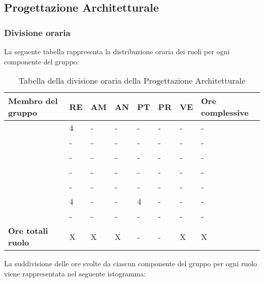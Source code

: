 \subsection{Progettazione Architetturale}

\subsubsection{Divisione oraria}
La seguente tabella rappresenta la distribuzione oraria dei ruoli per ogni componente del gruppo:
\renewcommand{\arraystretch}{2}
\begin{longtable}[h!] { C{4cm} C{1cm} C{1cm} C{1cm} C{1cm} C{1cm} C{1cm} C{3cm}}
\caption{Tabella della divisione oraria della Progettazione Architetturale}\\
\rowcolor{\primaryColor}

\textcolor{\secondaryColor}{\textbf{Membro del gruppo}} & 
\textcolor{\secondaryColor}{\textbf{RE}} & 
\textcolor{\secondaryColor}{\textbf{AM}} & 
\textcolor{\secondaryColor}{\textbf{AN}} & 
\textcolor{\secondaryColor}{\textbf{PT}} & 
\textcolor{\secondaryColor}{\textbf{PR}} & 
\textcolor{\secondaryColor}{\textbf{VE}} & 
\textcolor{\secondaryColor}{\textbf{Ore complessive}}\\	
\endhead
        
\AD{}                     &  4 &  - &  - & - & - & - & - \\
\AT{}                     &  - &  - &  - & - & - & - & - \\
\AW{}                     &  - &  - &  - & - & - & - & - \\
\EC{}                     &  - &  - &  - & - & - & - & - \\
\EM{}                     &  - &  - &  - & - & - & - & - \\
\FP{}                     &  4 &  - &  - & 4 & - & - & - \\
\GG{}                     &  - &  - &  - & - & - & - & - \\
\textbf{Ore totali ruolo} & X & X & X & - & - & X & X 

		
\end{longtable}
La suddivisione delle ore svolte da ciascun componente del gruppo per ogni ruolo viene rappresentata nel seguente istogramma:

